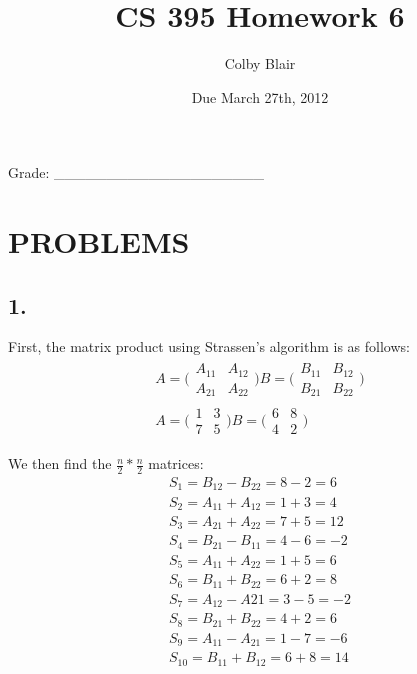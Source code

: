 \documentclass[11pt,letterpaper]{article}
\date{Due March 27th, 2012}
\title{CS 395 Homework 6}
\author{Colby Blair}
\begin{document}
\maketitle

\begin{center}

Grade: \_\_\_\_\_\_\_\_\_\_\_\_\_\_\_\_\_\_\_\_
\end{center}

\thispagestyle{empty}

\pagebreak


\section*{PROBLEMS}

\subsection*{1.}
First, the matrix product using Strassen's algorithm is as follows:
\begin{eqnarray}
	A = 	\bigl(
		\begin{smallmatrix}
		A_{11} & A_{12} \\
		A_{21} & A_{22}
		\end{smallmatrix} \bigr)
	B = 	\bigl(
		\begin{smallmatrix}
		B_{11} & B_{12} \\
		B_{21} & B_{22}
		\end{smallmatrix} \bigr)
\\
	A = 	\bigl(
		\begin{smallmatrix}
		1 & 3 \\
		7 & 5
		\end{smallmatrix} \bigr)
	B = 	\bigl(
		\begin{smallmatrix}
		6 & 8\\
		4 & 2
		\end{smallmatrix} \bigr)
\end{eqnarray}

We then find the $ \frac{n}{2} * \frac{n}{2} $ matrices:
\begin{eqnarray}
	S_1 = B_{12} - B_{22} = 8 - 2 = 6 \\
	S_2 = A_{11} + A_{12} = 1 + 3 = 4 \\
	S_3 = A_{21} + A_{22} = 7 + 5 = 12 \\
	S_4 = B_{21} - B_{11} = 4 - 6 = -2 \\
	S_5 = A_{11} + A_{22} = 1 + 5 = 6 \\
	S_6 = B_{11} + B_{22} = 6 + 2 = 8 \\
	S_7 = A_{12} - A{21} = 3 - 5 = -2 \\
	S_8 = B_{21} + B_{22} = 4 + 2 = 6 \\
	S_9 = A_{11} - A_{21} = 1 - 7 = -6 \\
	S_{10} = B_{11} + B_{12} = 6 + 8 = 14
\end{eqnarray}
\end{document}
